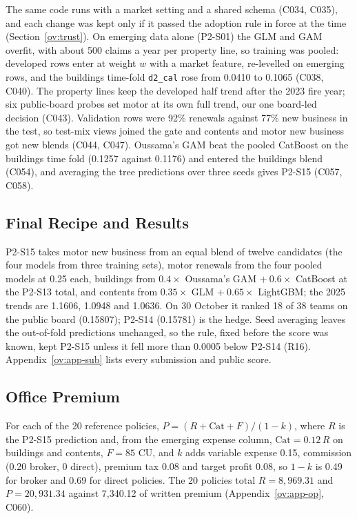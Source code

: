 \documentclass{rapport}
\begin{document}
The same code runs with a market setting and a shared schema (C034, C035), and each change was kept only if it passed
the adoption rule in force at the time (Section~\ref{ov:trust}). On emerging data alone (P2-S01) the GLM and GAM
overfit, with about 500 claims a year per property line, so training was pooled: developed rows enter at weight $w$
with a market feature, re-levelled on emerging rows, and the buildings time-fold \texttt{d2\_cal} rose from 0.0410 to
0.1065 (C038, C040). The property lines keep the developed half trend after the 2023 fire year; six public-board probes
set motor at its own full trend, our one board-led decision (C043). Validation rows were 92\% renewals against 77\% new
business in the test, so test-mix views joined the gate and contents and motor new business got new blends (C044,
C047). Oussama's GAM beat the pooled CatBoost on the buildings time fold (0.1257 against 0.1176) and entered the
buildings blend (C054), and averaging the tree predictions over three seeds gives P2-S15 (C057, C058).

\subsection{Final Recipe and Results}

P2-S15 takes motor new business from an equal blend of twelve candidates (the four models from three training sets),
motor renewals from the four pooled models at 0.25 each, buildings from $0.4\times$ Oussama's GAM $+\ 0.6\times$
CatBoost at the P2-S13 total, and contents from $0.35\times$ GLM $+\ 0.65\times$ LightGBM; the 2025 trends are 1.1606,
1.0948 and 1.0636. On 30 October it ranked 18 of 38 teams on the public board (0.15807); P2-S14 (0.15781) is the hedge.
Seed averaging leaves the out-of-fold predictions unchanged, so the rule, fixed before the score was known, kept P2-S15
unless it fell more than 0.0005 below P2-S14 (R16). Appendix~\ref{ov:app-sub} lists every submission and public score.

\subsection{Office Premium}

For each of the 20 reference policies, $P = (R + \mathrm{Cat} + F)/(1-k)$, where $R$ is the P2-S15 prediction and, from
the emerging expense column, $\mathrm{Cat} = 0.12\,R$ on buildings and contents, $F = 85$ CU, and $k$ adds variable
expense 0.15, commission (0.20 broker, 0 direct), premium tax 0.08 and target profit 0.08, so $1-k$ is 0.49 for broker
and 0.69 for direct policies. The 20 policies total $R = 8{,}969.31$ and $P = 20{,}931.34$ against 7,340.12 of written
premium (Appendix~\ref{ov:app-op}, C060).
\end{document}
